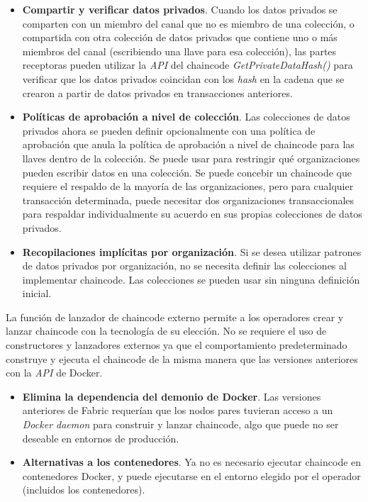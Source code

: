 {\begin{itemize}
\item {\bf Compartir y verificar datos privados}. Cuando los datos privados se comparten con un miembro del canal que no es miembro de una colecci\'on, o compartida con otra colecci\'on de datos privados que contiene uno o m\'as miembros del canal (escribiendo una llave para esa colecci\'on), las partes receptoras pueden utilizar la \emph{API} del chaincode \emph{GetPrivateDataHash()} para verificar que los datos privados coincidan con los \emph{hash} en la cadena que se crearon a partir de datos privados en transacciones anteriores.

\item {\bf Pol\'iticas de aprobaci\'on a nivel de colecci\'on}. Las colecciones de datos privados ahora se pueden definir opcionalmente con una pol\'itica de aprobaci\'on que anula la pol\'itica de aprobaci\'on a nivel de chaincode para las llaves dentro de la colecci\'on. Se puede usar para restringir qu\'e organizaciones pueden escribir datos en una colecci\'on. Se puede concebir un chaincode que requiere el respaldo de la mayor\'ia de las organizaciones, pero para cualquier transacci\'on determinada, puede necesitar dos organizaciones transaccionales para respaldar individualmente su acuerdo en sus propias colecciones de datos privados.

\item {\bf Recopilaciones impl\'icitas por organizaci\'on}. Si se desea utilizar patrones de datos privados por organizaci\'on, no se necesita definir las colecciones al implementar chaincode. Las colecciones se pueden usar sin ninguna definici\'on inicial.
\end{itemize}

La funci\'on de lanzador de chaincode externo permite a los operadores crear y lanzar chaincode con la tecnolog\'ia de su elecci\'on. No se requiere el uso de constructores y lanzadores externos ya que el comportamiento predeterminado construye y ejecuta el chaincode de la misma manera que las versiones anteriores con la \emph{API} de Docker.

\begin{itemize}
\item {\bf Elimina la dependencia del demonio de Docker}. Las versiones anteriores de Fabric requer\'ian que los nodos pares tuvieran acceso a un \emph{Docker daemon}  para construir y lanzar chaincode, algo que puede no ser deseable en entornos de producci\'on.

\item {\bf Alternativas a los contenedores}. Ya no es necesario ejecutar chaincode en contenedores Docker, y puede ejecutarse en el entorno elegido por el operador (incluidos los contenedores).



\end{itemize}}
